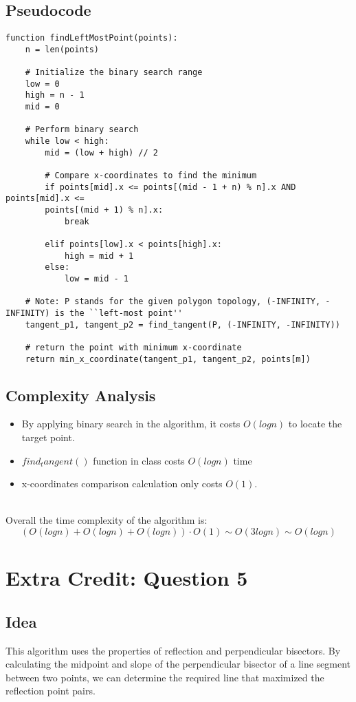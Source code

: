 \documentclass{article}
\begin{document}
\subsection*{Pseudocode}
\begin{verbatim}
function findLeftMostPoint(points):
    n = len(points)

    # Initialize the binary search range
    low = 0
    high = n - 1
    mid = 0

    # Perform binary search
    while low < high:
        mid = (low + high) // 2

        # Compare x-coordinates to find the minimum
        if points[mid].x <= points[(mid - 1 + n) % n].x AND points[mid].x <=
        points[(mid + 1) % n].x:
            break

        elif points[low].x < points[high].x:
            high = mid + 1
        else:
            low = mid - 1

    # Note: P stands for the given polygon topology, (-INFINITY, -INFINITY) is the ``left-most point''
    tangent_p1, tangent_p2 = find_tangent(P, (-INFINITY, -INFINITY))

    # return the point with minimum x-coordinate
    return min_x_coordinate(tangent_p1, tangent_p2, points[m])
\end{verbatim}

\subsection*{Complexity Analysis}
\begin{itemize}
    \item By applying binary search in the algorithm, it costs $O(logn)$ to locate the target point.
    \item $find_tangent()$ function in class costs $O(logn)$ time
    \item x-coordinates comparison calculation only costs $O(1)$.
\end{itemize}
\\
Overall the time complexity of the algorithm is:
\[ ( O(logn) + O(logn) + O(logn) ) \cdot O(1) \sim O(3logn) \sim O(logn) \]

\section*{Extra Credit: Question 5}

\subsection*{Idea}
This algorithm uses the properties of reflection and perpendicular bisectors. By calculating the midpoint and slope of the perpendicular bisector of a line segment between two points, we can determine the required line that maximized the reflection point pairs.
\end{document}
